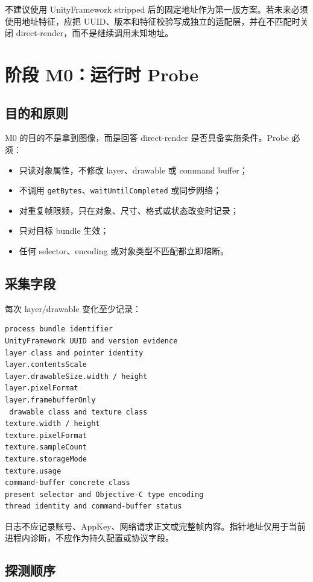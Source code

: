\documentclass[UTF8,a4paper,11pt]{ctexart}
\begin{document}
不建议使用 UnityFramework stripped 后的固定地址作为第一版方案。若未来必须使用地址特征，应把 UUID、版本和特征校验写成独立的适配层，并在不匹配时关闭 direct-render，而不是继续调用未知地址。

\section{阶段 M0：运行时 Probe}

\subsection{目的和原则}

M0 的目的不是拿到图像，而是回答 direct-render 是否具备实施条件。Probe 必须：

\begin{itemize}
  \item 只读对象属性，不修改 layer、drawable 或 command buffer；
  \item 不调用 \texttt{getBytes}、\texttt{waitUntilCompleted} 或同步网络；
  \item 对重复帧限频，只在对象、尺寸、格式或状态改变时记录；
  \item 只对目标 bundle 生效；
  \item 任何 selector、encoding 或对象类型不匹配都立即熔断。
\end{itemize}

\subsection{采集字段}

每次 layer/drawable 变化至少记录：

\begin{lstlisting}
process bundle identifier
UnityFramework UUID and version evidence
layer class and pointer identity
layer.contentsScale
layer.drawableSize.width / height
layer.pixelFormat
layer.framebufferOnly
 drawable class and texture class
texture.width / height
texture.pixelFormat
texture.sampleCount
texture.storageMode
texture.usage
command-buffer concrete class
present selector and Objective-C type encoding
thread identity and command-buffer status
\end{lstlisting}

日志不应记录账号、AppKey、网络请求正文或完整帧内容。指针地址仅用于当前进程内诊断，不应作为持久配置或协议字段。

\subsection{探测顺序}
\end{document}
